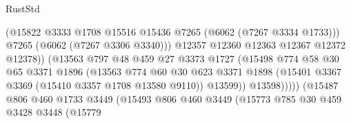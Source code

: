 \begin{lexlean}{RustStd}
\begin{coremodule}
                                            (@15822
                                              @3333
                                              @1708
                                              @15516
                                              @15436
                                              @7265
                                              (@6062 (@7267 @3334 @1733)))
                                            @7265
                                            (@6062 (@7267 @3306 @3340)))
                                          @12357
                                          @12360
                                          @12363
                                          @12367
                                          @12372
                                          @12378))
                                      (@13563
                                        @797
                                        @48
                                        @459
                                        @27
                                        @3373
                                        @1727
                                        (@15498
                                          @774
                                          @58
                                          @30
                                          @65
                                          @3371
                                          @1896
                                          (@13563
                                            @774
                                            @60
                                            @30
                                            @623
                                            @3371
                                            @1898
                                            (@15401 @3367 @3369 (@15410 @3357 @1708 @13580 @9110))
                                            @13599))
                                        @13598)))))
                              (@15487
                                @806
                                @460
                                @1733
                                @3449
                                (@15493
                                  @806
                                  @460
                                  @3449
                                  (@15773
                                    @785
                                    @30
                                    @459
                                    @3428
                                    @3448
                                    (@15779

\end{coremodule}
\end{lexlean}
